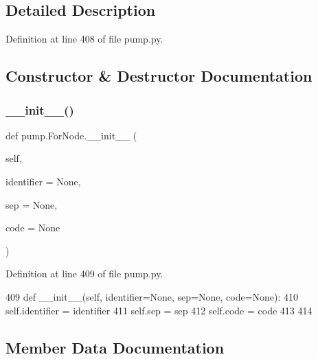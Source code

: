 \subsection{Detailed Description}


Definition at line 408 of file pump.\+py.



\subsection{Constructor \& Destructor Documentation}
\mbox{\label{classpump_1_1ForNode_a9cf60468cacdb06acce35074ab2a2b55}} 
\subsubsection{\texorpdfstring{\+\_\+\+\_\+init\+\_\+\+\_\+()}{\_\_init\_\_()}}
{\footnotesize\ttfamily def pump.\+For\+Node.\+\_\+\+\_\+init\+\_\+\+\_\+ (\begin{DoxyParamCaption}\item[{}]{self,  }\item[{}]{identifier = {\ttfamily None},  }\item[{}]{sep = {\ttfamily None},  }\item[{}]{code = {\ttfamily None} }\end{DoxyParamCaption})}



Definition at line 409 of file pump.\+py.


\begin{DoxyCode}
409   \textcolor{keyword}{def }\_\_init\_\_(self, identifier=None, sep=None, code=None):
410     self.identifier = identifier
411     self.sep = sep
412     self.code = code
413 
414 
\end{DoxyCode}


\subsection{Member Data Documentation}
\mbox{\label{classpump_1_1ForNode_afdb5f4f2a3bc772bbc6ea777dfde898e}} 
